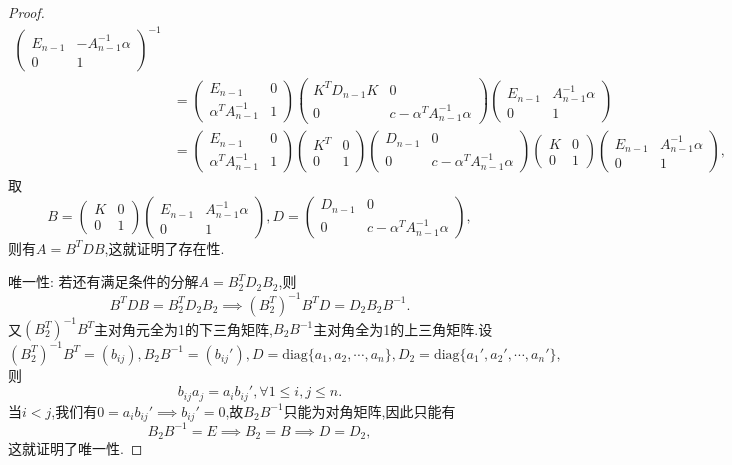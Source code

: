 \documentclass[../../main.tex]{subfiles}%
\begin{document}
\begin{proof}
\[\begin{aligned}
\begin{pmatrix}
E_{n - 1} & -A_{n - 1}^{-1} \alpha \\
0 & 1
\end{pmatrix}^{-1} \\
&= \begin{pmatrix}
E_{n - 1} & 0 \\
\alpha^T A_{n - 1}^{-1} & 1
\end{pmatrix} \begin{pmatrix}
K^T D_{n - 1} K & 0 \\
0 & c - \alpha^T A_{n - 1}^{-1} \alpha
\end{pmatrix} \begin{pmatrix}
E_{n - 1} & A_{n - 1}^{-1} \alpha \\
0 & 1
\end{pmatrix} \\
&= \begin{pmatrix}
E_{n - 1} & 0 \\
\alpha^T A_{n - 1}^{-1} & 1
\end{pmatrix} \begin{pmatrix}
K^T & 0 \\
0 & 1
\end{pmatrix} \begin{pmatrix}
D_{n - 1} & 0 \\
0 & c - \alpha^T A_{n - 1}^{-1} \alpha
\end{pmatrix} \begin{pmatrix}
K & 0 \\
0 & 1
\end{pmatrix} \begin{pmatrix}
E_{n - 1} & A_{n - 1}^{-1} \alpha \\
0 & 1
\end{pmatrix},
\end{aligned}
\]
取
\[
B = \begin{pmatrix}
K & 0 \\
0 & 1
\end{pmatrix} \begin{pmatrix}
E_{n - 1} & A_{n - 1}^{-1} \alpha \\
0 & 1
\end{pmatrix}, D = \begin{pmatrix}
D_{n - 1} & 0 \\
0 & c - \alpha^T A_{n - 1}^{-1} \alpha
\end{pmatrix},
\]
则有\( A = B^T D B \),这就证明了存在性.

{\heiti 唯一性:} 若还有满足条件的分解\( A = B_2^T D_2 B_2 \),则
\[
B^T D B = B_2^T D_2 B_2 \implies (B_2^T)^{-1} B^T D = D_2 B_2 B^{-1}.
\]
又\( (B_2^T)^{-1} B^T \)主对角元全为1的下三角矩阵,\( B_2 B^{-1} \)主对角全为1的上三角矩阵.设
\[
(B_2^T)^{-1} B^T = (b_{ij}), B_2 B^{-1} = (b_{ij}'), D = \text{diag}\{a_1, a_2, \cdots, a_n\}, D_2 = \text{diag}\{a_1', a_2', \cdots, a_n'\},
\]
则
\[
b_{ij} a_j = a_i b_{ij}', \forall 1 \leqslant  i, j \leqslant  n.
\]
当\( i < j \),我们有\( 0 = a_i b_{ij}' \implies b_{ij}' = 0 \),故\( B_2 B^{-1} \)只能为对角矩阵,因此只能有
\[
B_2 B^{-1} = E \implies B_2 = B \implies D = D_2,
\]
这就证明了唯一性.

\end{proof}
\end{document}
